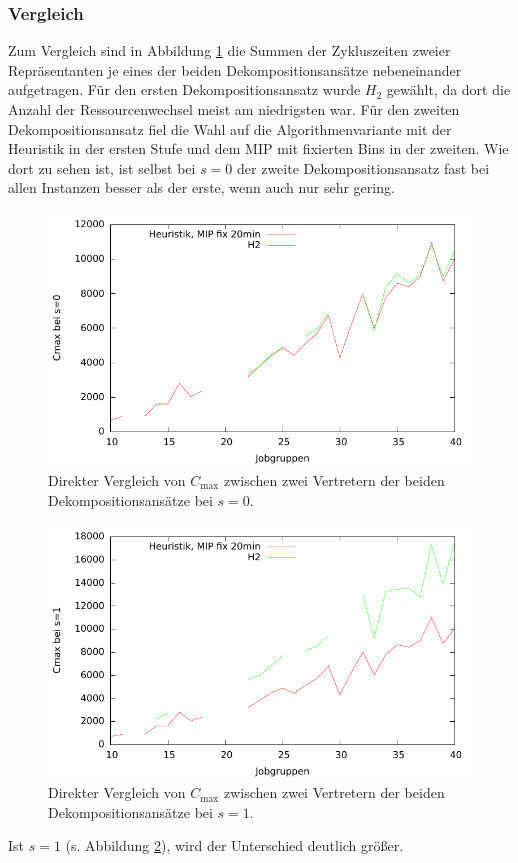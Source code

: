 \documentclass{scrreprt}
\begin{document}
\subsubsection{Vergleich}
Zum Vergleich sind in Abbildung \ref{abb:plotcomp} die Summen der Zykluszeiten zweier Repräsentanten je eines der beiden Dekompositionsansätze nebeneinander aufgetragen.
Für den ersten Dekompositionsansatz wurde $H_2$ gewählt, da dort die Anzahl der Ressourcenwechsel meist am niedrigsten war.
Für den zweiten Dekompositionsansatz fiel die Wahl auf die Algorithmenvariante mit der Heuristik in der ersten Stufe und dem MIP mit fixierten Bins in der zweiten.
Wie dort zu sehen ist, ist selbst bei $s=0$ der zweite Dekompositionsansatz fast bei allen Instanzen besser als der erste, wenn auch nur sehr gering.
\begin{figure}
    \begin{center}
        \includegraphics[width=.8\textwidth]{../prog/binpacking/results/plotcomp.pdf}
    \end{center}
    \caption{
        \label{abb:plotcomp}
        Direkter Vergleich von $C_{\max}$ zwischen zwei Vertretern der beiden Dekompositionsansätze bei $s=0$.
    }
\end{figure}
\begin{figure}
    \begin{center}
        \includegraphics[width=.8\textwidth]{../prog/binpacking/results/plotcomp2.pdf}
    \end{center}
    \caption{
        \label{abb:plotcomp2}
        Direkter Vergleich von $C_{\max}$ zwischen zwei Vertretern der beiden Dekompositionsansätze bei $s=1$.
    }
\end{figure}
Ist $s=1$ (s. Abbildung \ref{abb:plotcomp2}), wird der Unterschied deutlich größer.
\end{document}
